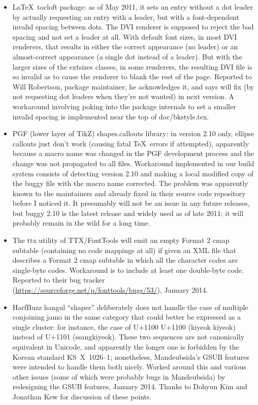 \documentclass[14pt]{extarticle}
\begin{document}
\begin{itemize}
  \item \LaTeX\ tocloft package:  as of May 2011, it sets an entry without a
    dot leader by actually requesting an entry with a leader, but with a
    font-dependent invalid spacing between dots.  The DVI renderer is
    supposed to reject the bad spacing and not set a leader at all.  With
    default font sizes, in most DVI renderers, that results in either the
    correct appearance (no leader) or an almost-correct appearance (a single
    dot instead of a leader).  But with the larger sizes of the extsizes
    classes, in some renderers, the resulting DVI file is so invalid as to
    cause the renderer to blank the rest of the page.  Reported to Will
    Robertson, package maintainer; he acknowledges it, and says will fix (by
    not requesting dot leaders when they're not wanted) in next version.  A
    workaround involving poking into the package internals to set a smaller
    invalid spacing is implemented near the top of doc/bkstyle.tex.

  \item PGF (lower layer of TikZ) shapes.callouts library: in version 2.10
    only, ellipse callouts just don't work (causing fatal \TeX\ errors if
    attempted), apparently because a macro name was changed in the PGF
    development process and the change was not propagated to all files. 
    Workaround implemented in our build system consists of detecting version
    2.10 and making a local modified copy of the buggy file with the macro
    name corrected.  The problem was apparently known to the maintainers and
    already fixed in their source code repository before I noticed it.  It
    presumably will not be an issue in any future releases, but buggy 2.10
    is the latest release and widely used as of late 2011; it will probably
    remain in the wild for a long time.

  \item The ttx utility of TTX/FontTools will emit an empty Format 2 cmap
    subtable (containing no code mappings at all) if given an XML file that
    describes a Format 2 cmap subtable in which all the character codes are
    single-byte codes.  Workaround is to include at least one
    double-byte code.  Reported to their bug tracker
    (\url{https://sourceforge.net/p/fonttools/bugs/53/}), January 2014.

  \item HarfBuzz hangul ``shaper'' deliberately does not handle the case of
    multiple conjoining jamo in the same category that could better be
    expressed as a single cluster: for instance, the case of U+1100 U+1100
    (kiyeok kiyeok) instead of U+1101 (ssangkiyeok).  These two sequences
    are not canonically equivalent in Unicode, and apparently the longer one
    is forbidden by the Korean standard KS~X~1026--1; nonetheless,
    Mandeubsida's GSUB features were intended to handle them both nicely. 
    Worked around this and various other issues (some of which were probably
    bugs in Mandeubsida) by redesigning the GSUB features, January 2014. 
    Thanks to Dohyun Kim and Jonathan Kew for discussion of these points.    
\end{itemize}
\end{document}
